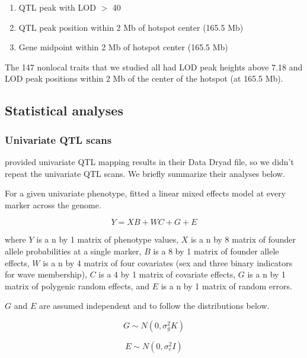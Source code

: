 \documentclass{article}
\begin{document}
\begin{enumerate}
    \item QTL peak with LOD $>$ 40
    \item QTL peak position within 2 Mb of hotspot center (165.5 Mb)
    \item Gene midpoint within 2 Mb of hotspot center (165.5 Mb)
\end{enumerate}

The 147 nonlocal traits that we studied all had LOD peak heights above 7.18 and LOD peak positions within 2 Mb of the center of the hotspot (at 165.5 Mb). 



\subsection{Statistical analyses}

\subsubsection{Univariate QTL scans}

\citet{keller2018genetic} provided univariate QTL mapping results in their Data Dryad file, so we didn't repeat the univariate QTL scans. We briefly summarize their analyses below.

For a given univariate phenotype, \citet{keller2018genetic} fitted a linear mixed effects model at every marker across the genome.

\begin{equation}
    Y = XB + WC + G + E
    \label{eqn:uni-lmm}
\end{equation}

where $Y$ is a n by 1 matrix of phenotype values, $X$ is a n by 8 matrix of founder allele probabilities at a single marker, $B$ is a 8 by 1 matrix of founder allele effects, $W$ is a n by 4 matrix of four covariates (sex and three binary indicators for wave membership), $C$ is a 4 by 1 matrix of covariate effects, $G$ is a n by 1 matrix of polygenic random effects, and $E$ is a n by 1 matrix of random errors.

$G$ and $E$ are assumed independent and to follow the distributions below.

\begin{equation}
    G \sim N(0, \sigma^2_gK)
\end{equation}

\begin{equation}
    E \sim N(0, \sigma^2_eI)
\end{equation}
\end{document}
